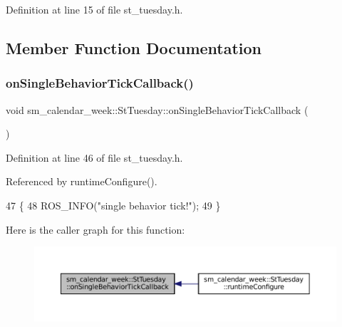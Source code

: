 Definition at line 15 of file st\+\_\+tuesday.\+h.



\subsection{Member Function Documentation}
\mbox{\label{structsm__calendar__week_1_1StTuesday_ac8fe86e252d56ac6900b521e010aa8c8}} 
\subsubsection{\texorpdfstring{on\+Single\+Behavior\+Tick\+Callback()}{onSingleBehaviorTickCallback()}}
{\footnotesize\ttfamily void sm\+\_\+calendar\+\_\+week\+::\+St\+Tuesday\+::on\+Single\+Behavior\+Tick\+Callback (\begin{DoxyParamCaption}{ }\end{DoxyParamCaption})\hspace{0.3cm}{\ttfamily [inline]}}



Definition at line 46 of file st\+\_\+tuesday.\+h.



Referenced by runtime\+Configure().


\begin{DoxyCode}
47     \{
48         ROS\_INFO(\textcolor{stringliteral}{"single behavior tick!"});
49     \}
\end{DoxyCode}
Here is the caller graph for this function\+:
\nopagebreak
\begin{figure}[H]
\begin{center}
\leavevmode
\includegraphics[width=350pt]{structsm__calendar__week_1_1StTuesday_ac8fe86e252d56ac6900b521e010aa8c8_icgraph}
\end{center}
\end{figure}
\mbox{\label{structsm__calendar__week_1_1StTuesday_a7d8597c9f4fae517b37147b90c49fb3c}} 
